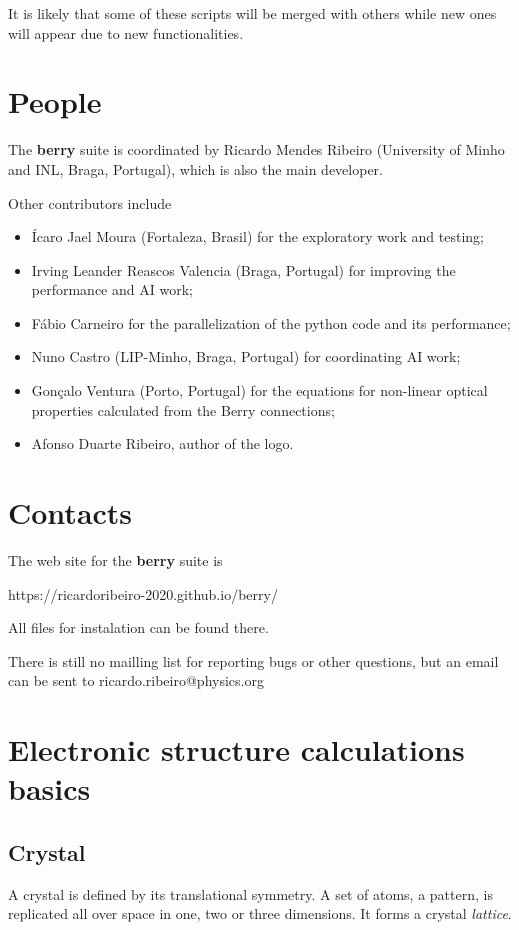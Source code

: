 \documentclass[a4paper,12pt]{report}
\begin{document}
It is likely that some of these scripts will be merged with others
while new ones will appear due to new functionalities.







\section{People}

The \textbf{berry} suite is coordinated by Ricardo Mendes Ribeiro (University of Minho and INL, Braga, Portugal),
which is also the main developer.\medskip

Other contributors include
\begin{itemize}
 \item Ícaro Jael Moura (Fortaleza, Brasil) for the exploratory work and testing;
 \item Irving Leander Reascos Valencia (Braga, Portugal) for improving the performance and AI work;
 \item Fábio Carneiro for the parallelization of the python code and its performance;
 \item Nuno Castro (LIP-Minho, Braga, Portugal) for coordinating AI work;
 \item Gonçalo Ventura (Porto, Portugal) for the equations for non-linear optical properties calculated from the Berry connections;
 \item Afonso Duarte Ribeiro, author of the logo.
\end{itemize}


\section{Contacts}

The web site for the \textbf{berry} suite is\medskip

https://ricardoribeiro-2020.github.io/berry/\medskip

All files for instalation can be found there.

There is still no mailling list for reporting bugs or other questions, but an email can be sent to
ricardo.ribeiro@physics.org


\section{Electronic structure calculations basics}

\subsection*{Crystal}
A crystal is defined by its translational symmetry.
A set of atoms, a pattern, is replicated all over space in one, two or three dimensions.
It forms a crystal \emph{lattice}.
\end{document}
